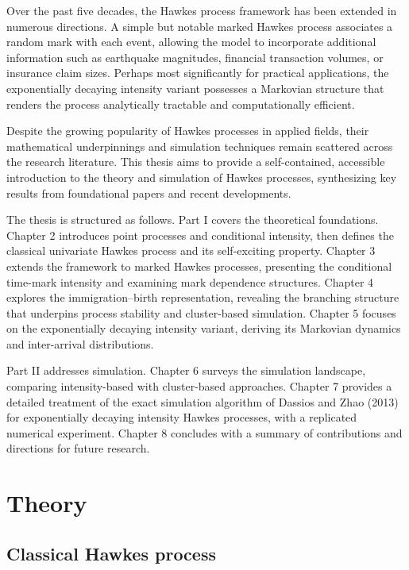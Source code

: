 \documentclass[12pt,a4paper]{report}
\theoremstyle{plain}
\theoremstyle{definition}
\theoremstyle{remark}
\newcommand{\1}{\mathbf{1}}
\begin{document}
\medskip
\noindent
Over the past five decades, the Hawkes process framework has been extended in numerous directions. A simple but notable marked Hawkes process associates a random mark with each event, allowing the model to incorporate additional information such as earthquake magnitudes, financial transaction volumes, or insurance claim sizes. Perhaps most significantly for practical applications, the exponentially decaying intensity variant possesses a Markovian structure that renders the process analytically tractable and computationally efficient.

\medskip
\noindent
Despite the growing popularity of Hawkes processes in applied fields, their mathematical underpinnings and simulation techniques remain scattered across the research literature. This thesis aims to provide a self-contained, accessible introduction to the theory and simulation of Hawkes processes, synthesizing key results from foundational papers and recent developments.

\medskip
\noindent
The thesis is structured as follows. Part I covers the theoretical foundations. Chapter 2 introduces point processes and conditional intensity, then defines the classical univariate Hawkes process and its self-exciting property. Chapter 3 extends the framework to marked Hawkes processes, presenting the conditional time-mark intensity and examining mark dependence structures. Chapter 4 explores the immigration--birth representation, revealing the branching structure that underpins process stability and cluster-based simulation. Chapter 5 focuses on the exponentially decaying intensity variant, deriving its Markovian dynamics and inter-arrival distributions.

\medskip
\noindent
Part II addresses simulation. Chapter 6 surveys the simulation landscape, comparing intensity-based with cluster-based approaches. Chapter 7 provides a detailed treatment of the exact simulation algorithm of Dassios and Zhao (2013) for exponentially decaying intensity Hawkes processes, with a replicated numerical experiment. Chapter 8 concludes with a summary of contributions and directions for future research.

\part{Theory}

\chapter{Classical Hawkes process}
\label{chap:2}
\end{document}
